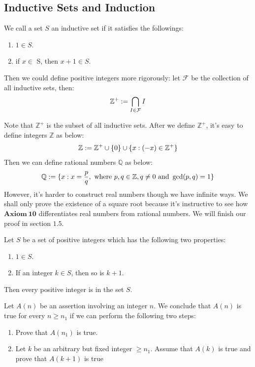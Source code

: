 \documentclass[a4paper]{ctexart}
\begin{document}
	\subsection{Inductive Sets and Induction}
	\begin{mydef}
		We call a set $S$ an inductive set if it satisfies the followings:
		\begin{enumerate}
			\item $1\in S$. 
			\item if $x\in$ S, then $x+1 \in S$.
		\end{enumerate}
		Then we could define positive integers more rigorously: let $\mathcal{F}$ be the collection of all inductive sets, then:
		\begin{equation}
			\mathbb{Z}^+ := \bigcap_{I\in \mathcal{F}}I \notag
		\end{equation}
	\end{mydef}
	\begin{myrmk}
		Note that $\mathbb{Z}^+$ is the subset of all inductive sets. After we define $\mathbb{Z}^+$, it's easy to define integers $\mathbb{Z}$ as below:
		\begin{equation}
			\mathbb{Z}:=\mathbb{Z}^+ \cup \{0\} \cup \{x:(-x)\in \mathbb{Z}^+\}\notag
		\end{equation}
		Then we can define rational numbers $\mathbb{Q}$ as below:
		\begin{equation}
			\mathbb{Q}:=\{x:x=\frac{p}{q},\text{ where } p,q \in \mathbb{Z}, q \neq 0 \text{ and } \gcd(p,q)=1\}\notag
		\end{equation}
		However, it's harder to construct real numbers though we have infinite ways. We shall only prove the existence of a square root because it's instructive to see how $\mathbf{Axiom\ 10}$ differentiates real numbers from rational numbers. We will finish our proof in section $1.5$.
	\end{myrmk}
	\begin{mythm}\label{pcp_ind}
		Let $S$ be a set of positive integers which has the following two properties:
		\begin{enumerate}
			\item $1\in S$.
			\item If an integer $k \in S$, then so is $k+1$.
		\end{enumerate}
		Then every positive integer is in the set $S$.
	\end{mythm}
	\begin{mymthd}\label{prove_by_indu}
		Let $A(n)$ be an assertion involving an integer $n$. We conclude that $A(n)$ is true for every $n\ge n_1$ if we can perform the following two steps:
		\begin{enumerate}
			\item Prove that $A(n_1)$ is true.
			\item Let $k$ be an arbitrary but fixed integer $\ge n_1$. Assume that $A(k)$ is true and prove that $A(k+1)$ is true
		\end{enumerate}
	\end{mymthd}
\end{document}
